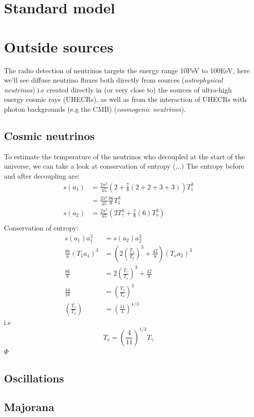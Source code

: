 \documentclass[11pt,a4paper,faculty=we,language=en,doctype=report]{cls/ugent-doc}
\begin{document}
\section{Standard model}
\section{Outside sources}
The radio detection of neutrinos targets the energy range 10PeV to 100EeV\cite{Aguilar_2021}, here we'll see diffuse neutrino fluxes both directly from sources (\textit{astrophysical neutrinos}) i.e created directly in (or very close to) the sources of ultra-high energy cosmic rays (UHECRs), as well as from the interaction of UHECRs with photon backgrounds (e.g the CMB) (\textit{cosmogenic neutrinos}).
\subsection{Cosmic neutrinos}
To estimate the temperature of the neutrinos who decoupled at the start of the universe, we can take a look at conservation of entropy \cite{Dodelson}
(...)
The entropy before and after decoupling are:
\begin{align}
	s(a_1) &= \frac{2\pi^2}{45}(2 + \frac{7}{8}(2+2+3+3))T_1^3\\
	&= \frac{2\pi^2}{45}\frac{86}{8}T_1^3\\
	s(a_2) &= \frac{2\pi^2}{45}(2T_\gamma^3 + \frac{7}{8}(6)T_\nu^3)\\
\end{align}
Conservation of entropy:
\begin{align}
	s(a_1)a_1^3 &= s(a_2)a_2^3\\
	\frac{86}{8}(T_1 a_1)^3 &= \left(2\left(\frac{T_\gamma}{T_\nu}\right)^3 + \frac{42}{8}\right)(T_\nu a_2)^3\\
	\frac{86}{8} &= 2\left(\frac{T_\gamma}{T_\nu}\right)^3 + \frac{42}{8}\\
	\frac{44}{16} &= \left(\frac{T_\gamma}{T_\nu}\right)^3\\
	\left(\frac{T_\gamma}{T_\nu}\right) &= \left(\frac{11}{4}\right)^{1/3}
\end{align}
i.e
\begin{equation}
	T_\nu = \left(\frac{4}{11}\right)^{1/3}T_\gamma
\end{equation}
$\Phi$
\subsection{Oscillations}
\subsection{Majorana}
\newpage
\end{document}
